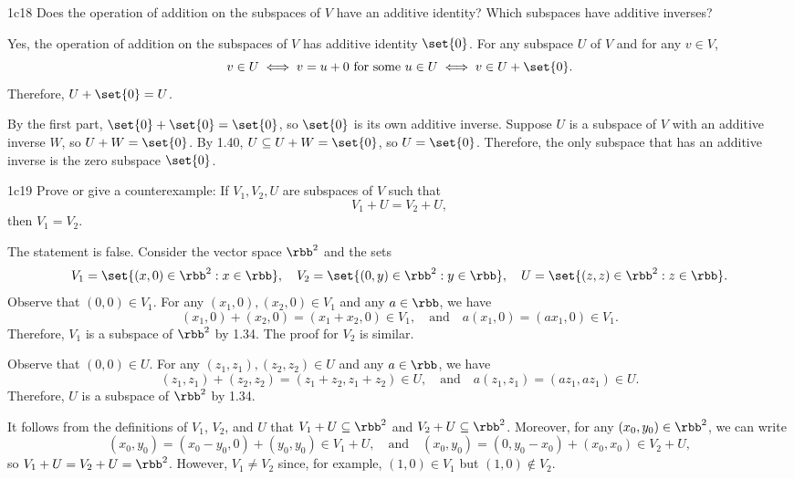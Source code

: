 \begin{exercise}{1c18}
    Does the operation of addition on the subspaces of $V$ have an additive identity?
	Which subspaces have additive inverses?
\end{exercise}

\begin{sol}
    Yes, the operation of addition on the subspaces of $V$ has additive identity $\set{0}$.
    For any subspace $U$ of $V$ and for any $v \in V$,
    \[
        v \in U \iff v = u + 0 \text{ for some } u \in U \iff v \in U + \set{0}.
    \]
    Therefore, $U + \set{0} = U$.

    By the first part, $\set{0} + \set{0} = \set{0}$, so $\set{0}$ is its own additive inverse.
    Suppose $U$ is a subspace of $V$ with an additive inverse $W$, so $U + W = \set{0}$.
    By 1.40, $U \subseteq U + W = \set{0}$, so $U = \set{0}$.
    Therefore, the only subspace that has an additive inverse is the zero subspace $\set{0}$.
\end{sol}

\begin{exercise}{1c19}
    Prove or give a counterexample: If $V_1, V_2, U$ are subspaces of $V$ such that
    \[
    	V_1 + U = V_2 + U,
    \]
    then $V_1 = V_2$.
\end{exercise}

\begin{sol}
    The statement is false.
	Consider the vector space $\rbb^2$ and the sets
    \[
    	V_1 = \set{(x, 0) \in \rbb^2 : x \in \rbb}, \quad V_2 = \set{(0, y) \in \rbb^2 : y \in \rbb}, \quad U = \set{(z, z) \in \rbb^2 : z \in \rbb}.
    \]
    Observe that $(0, 0) \in V_1$.
    For any $(x_1, 0), (x_2, 0) \in V_1$ and any $a \in \rbb$, we have
    \[
        (x_1, 0) + (x_2, 0) = (x_1 + x_2, 0) \in V_1, \quad \text{and} \quad a(x_1, 0) = (ax_1, 0) \in V_1.
    \]
    Therefore, $V_1$ is a subspace of $\rbb^2$ by 1.34.
    The proof for $V_2$ is similar.

    Observe that $(0, 0) \in U$.
    For any $(z_1, z_1), (z_2, z_2) \in U$ and any $a \in \rbb$, we have
    \[
        (z_1, z_1) + (z_2, z_2) = (z_1 + z_2, z_1 + z_2) \in U, \quad \text{and} \quad a(z_1, z_1) = (az_1, az_1) \in U.
    \]
    Therefore, $U$ is a subspace of $\rbb^2$ by 1.34.

    It follows from the definitions of $V_1$, $V_2$, and $U$ that $V_1 + U \subseteq \rbb^2$ and $V_2 + U \subseteq \rbb^2$.
    Moreover, for any $(x_0, y_0) \in \rbb^2$, we can write
    \[
        (x_0, y_0) = (x_0 - y_0, 0) + (y_0, y_0) \in V_1 + U, \quad \text{and} \quad (x_0, y_0) = (0, y_0 - x_0) + (x_0, x_0) \in V_2 + U,
    \]
    so $V_1 + U = V_2 + U = \rbb^2$.
    However, $V_1 \neq V_2$ since, for example, $(1, 0) \in V_1$ but $(1, 0) \notin V_2$.
\end{sol}

